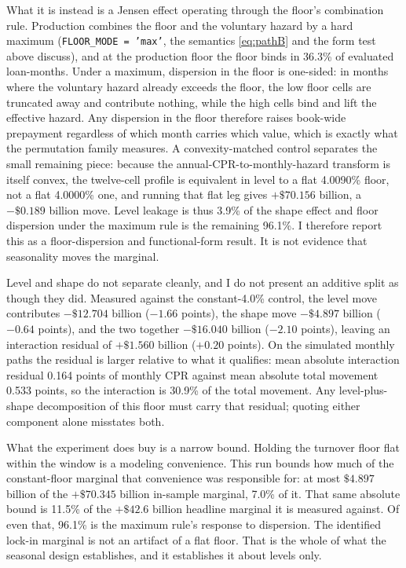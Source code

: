 \documentclass[12pt]{article}
\begin{document}
What it is instead is a Jensen effect operating through the floor's combination rule. Production combines the floor and the voluntary hazard by a hard maximum (\texttt{FLOOR\_MODE = 'max'}, the semantics \eqref{eq:pathB} and the form test above discuss), and at the production floor the floor binds in 36.3\% of evaluated loan-months. Under a maximum, dispersion in the floor is one-sided: in months where the voluntary hazard already exceeds the floor, the low floor cells are truncated away and contribute nothing, while the high cells bind and lift the effective hazard. Any dispersion in the floor therefore raises book-wide prepayment regardless of which month carries which value, which is exactly what the permutation family measures. A convexity-matched control separates the small remaining piece: because the annual-CPR-to-monthly-hazard transform is itself convex, the twelve-cell profile is equivalent in level to a flat 4.0090\% floor, not a flat 4.0000\% one, and running that flat leg gives $+\$70.156$ billion, a $-\$0.189$ billion move. Level leakage is thus 3.9\% of the shape effect and floor dispersion under the maximum rule is the remaining 96.1\%. I therefore report this as a floor-dispersion and functional-form result. It is not evidence that seasonality moves the marginal.

Level and shape do not separate cleanly, and I do not present an additive split as though they did. Measured against the constant-4.0\% control, the level move contributes $-\$12.704$ billion ($-1.66$ points), the shape move $-\$4.897$ billion ($-0.64$ points), and the two together $-\$16.040$ billion ($-2.10$ points), leaving an interaction residual of $+\$1.560$ billion ($+0.20$ points). On the simulated monthly paths the residual is larger relative to what it qualifies: mean absolute interaction residual 0.164 points of monthly CPR against mean absolute total movement 0.533 points, so the interaction is 30.9\% of the total movement. Any level-plus-shape decomposition of this floor must carry that residual; quoting either component alone misstates both.

What the experiment does buy is a narrow bound. Holding the turnover floor flat within the window is a modeling convenience. This run bounds how much of the constant-floor marginal that convenience was responsible for: at most $\$4.897$ billion of the $+\$70.345$ billion in-sample marginal, 7.0\% of it. That same absolute bound is 11.5\% of the $+\$42.6$ billion headline marginal it is measured against. Of even that, 96.1\% is the maximum rule's response to dispersion. The identified lock-in marginal is not an artifact of a flat floor. That is the whole of what the seasonal design establishes, and it establishes it about levels only.
\end{document}
